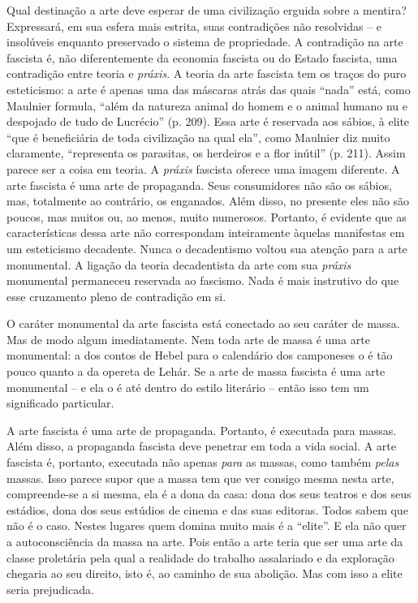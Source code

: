 Qual destinação a arte deve esperar de uma civilização erguida sobre a
mentira? Expressará, em sua esfera mais estrita, suas contradições não
resolvidas -- e insolúveis enquanto preservado o sistema de propriedade.
A contradição na arte fascista é, não diferentemente da economia
fascista ou do Estado fascista, uma contradição entre teoria e
\emph{práxis}. A teoria da arte fascista tem os traços do puro
esteticismo: a arte é apenas uma das máscaras atrás das quais ``nada''
está, como Maulnier formula, ``além da natureza animal do homem e o
animal humano nu e despojado de tudo de Lucrécio'' (p. 209). Essa arte é
reservada aos sábios, à elite ``que é beneficiária de toda civilização
na qual ela'', como Maulnier diz muito claramente, ``representa os
parasitas, os herdeiros e a flor inútil'' (p. 211). Assim parece ser a
coisa em teoria. A \emph{práxis} fascista oferece uma imagem diferente.
A arte fascista é uma arte de propaganda. Seus consumidores não são os
sábios, mas, totalmente ao contrário, os enganados. Além disso, no
presente eles não são poucos, mas muitos ou, ao menos, muito numerosos.
Portanto, é evidente que as características dessa arte não correspondam
inteiramente àquelas manifestas em um esteticismo decadente. Nunca o
decadentismo voltou sua atenção para a arte monumental. A ligação da
teoria decadentista da arte com sua \emph{práxis} monumental permaneceu
reservada ao fascismo. Nada é mais instrutivo do que esse cruzamento
pleno de contradição em si.

O caráter monumental da arte fascista está conectado ao seu caráter de
massa. Mas de modo algum imediatamente. Nem toda arte de massa é uma
arte monumental: a dos contos de Hebel para o calendário dos camponeses
o é tão pouco quanto a da opereta de Lehár. Se a arte de massa fascista
é uma arte monumental -- e ela o é até dentro do estilo literário --
então isso tem um significado particular.

A arte fascista é uma arte de propaganda. Portanto, é executada para
massas. Além disso, a propaganda fascista deve penetrar em toda a vida
social. A arte fascista é, portanto, executada não apenas \emph{para} as
massas, como também \emph{pelas} massas. Isso parece supor que a massa
tem que ver consigo mesma nesta arte, compreende-se a si mesma, ela é a
dona da casa: dona dos seus teatros e dos seus estádios, dona dos seus
estúdios de cinema e das suas editoras. Todos sabem que não é o caso.
Nestes lugares quem domina muito mais é a ``elite''. E ela não quer a
autoconsciência da massa na arte. Pois então a arte teria que ser uma
arte da classe proletária pela qual a realidade do trabalho assalariado
e da exploração chegaria ao seu direito, isto é, ao caminho de sua
abolição. Mas com isso a elite seria prejudicada.

